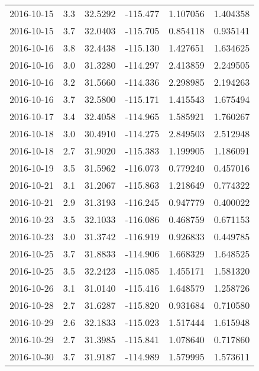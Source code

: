 \begin{tabular}{lrrrrr}
2016-10-15 &       3.3 &  32.5292 &  -115.477 &         1.107056 &         1.404358 \\
2016-10-15 &       3.7 &  32.0403 &  -115.705 &         0.854118 &         0.935141 \\
2016-10-16 &       3.8 &  32.4438 &  -115.130 &         1.427651 &         1.634625 \\
2016-10-16 &       3.0 &  31.3280 &  -114.297 &         2.413859 &         2.249505 \\
2016-10-16 &       3.2 &  31.5660 &  -114.336 &         2.298985 &         2.194263 \\
2016-10-16 &       3.7 &  32.5800 &  -115.171 &         1.415543 &         1.675494 \\
2016-10-17 &       3.4 &  32.4058 &  -114.965 &         1.585921 &         1.760267 \\
2016-10-18 &       3.0 &  30.4910 &  -114.275 &         2.849503 &         2.512948 \\
2016-10-18 &       2.7 &  31.9020 &  -115.383 &         1.199905 &         1.186091 \\
2016-10-19 &       3.5 &  31.5962 &  -116.073 &         0.779240 &         0.457016 \\
2016-10-21 &       3.1 &  31.2067 &  -115.863 &         1.218649 &         0.774322 \\
2016-10-21 &       2.9 &  31.3193 &  -116.245 &         0.947779 &         0.400022 \\
2016-10-23 &       3.5 &  32.1033 &  -116.086 &         0.468759 &         0.671153 \\
2016-10-23 &       3.0 &  31.3742 &  -116.919 &         0.926833 &         0.449785 \\
2016-10-25 &       3.7 &  31.8833 &  -114.906 &         1.668329 &         1.648525 \\
2016-10-25 &       3.5 &  32.2423 &  -115.085 &         1.455171 &         1.581320 \\
2016-10-26 &       3.1 &  31.0140 &  -115.416 &         1.648579 &         1.258726 \\
2016-10-28 &       2.7 &  31.6287 &  -115.820 &         0.931684 &         0.710580 \\
2016-10-29 &       2.6 &  32.1833 &  -115.023 &         1.517444 &         1.615948 \\
2016-10-29 &       2.7 &  31.3985 &  -115.841 &         1.078640 &         0.717860 \\
2016-10-30 &       3.7 &  31.9187 &  -114.989 &         1.579995 &         1.573611 \\

\end{tabular}
